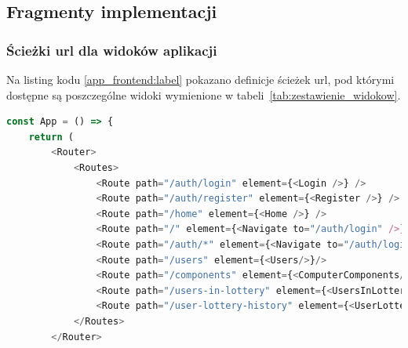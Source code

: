 \newpage
\subsection{Fragmenty implementacji}
	\subsubsection{Ścieżki url dla widoków aplikacji}
	Na listing kodu \ref{app_frontend:label} pokazano definicje ścieżek url, pod którymi dostępne są poszczególne widoki wymienione w tabeli~\ref{tab:zestawienie_widokow}.
\begin{lstlisting}[language=JavaScript, style=JavaScriptStyle,  caption={Zdefiniowane ścieżki url widoków systemu }, label={app_frontend:label}]
	const App = () => {
    return (
        <Router>
            <Routes>
                <Route path="/auth/login" element={<Login />} />
                <Route path="/auth/register" element={<Register />} />
                <Route path="/home" element={<Home />} />
                <Route path="/" element={<Navigate to="/auth/login" />} />
                <Route path="/auth/*" element={<Navigate to="/auth/login" />} />
                <Route path="/users" element={<Users/>}/>
                <Route path="/components" element={<ComputerComponents/>}/>
                <Route path="/users-in-lottery" element={<UsersInLottery/>}/>
                <Route path="/user-lottery-history" element={<UserLotteryHistory/>}/>
            </Routes>
        </Router>
\end{lstlisting}


